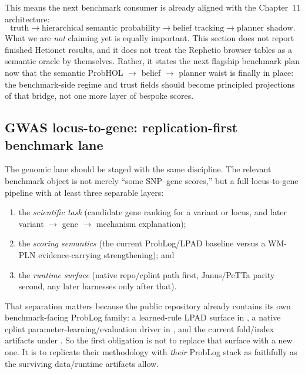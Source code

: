 \documentclass[11pt,openany]{report}
\begin{document}
This means the next benchmark consumer is already aligned with the
Chapter~11 architecture:
\[
  \text{truth}
  \to \text{hierarchical semantic probability}
  \to \text{belief tracking}
  \to \text{planner shadow}.
\]
What we are \emph{not} claiming yet is equally important.  This section
does not report finished Hetionet results, and it does not treat the
Rephetio browser tables as a semantic oracle by themselves.  Rather, it
states the next flagship benchmark plan now that the semantic
ProbHOL $\rightarrow$ belief $\rightarrow$ planner waist is finally in
place: the benchmark-side regime and trust fields should become
principled projections of that bridge, not one more layer of bespoke
scores.

\subsection{GWAS locus-to-gene: replication-first benchmark lane}

The genomic lane should be staged with the same discipline.  The relevant
benchmark object is not merely ``some SNP--gene scores,'' but a full
locus-to-gene pipeline with at least three separable layers:
\begin{enumerate}
\item the \emph{scientific task} (candidate gene ranking for a variant or
  locus, and later variant $\to$ gene $\to$ mechanism explanation);
\item the \emph{scoring semantics} (the current ProbLog/LPAD baseline versus a
  WM-PLN evidence-carrying strengthening); and
\item the \emph{runtime surface} (native repo/cplint path first, Janus/PeTTa
  parity second, any later harnesses only after that).
\end{enumerate}
That separation matters because the public
 repository already contains its own
benchmark-facing ProbLog family: a learned-rule LPAD surface in
, a native cplint parameter-learning/evaluation
driver in , and the current fold/index artifacts
under .  So the first obligation is not to replace that
surface with a new one.  It is to replicate their methodology with
\emph{their} ProbLog stack as faithfully as the surviving data/runtime
artifacts allow.
\end{document}
